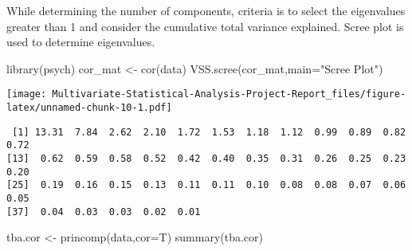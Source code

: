 \documentclass[12pt,twoside]{deuthesis}
\newenvironment{Shaded}{\begin{snugshade}}{\end{snugshade}}
\newcommand{\AttributeTok}[1]{\textcolor[rgb]{0.77,0.63,0.00}{#1}}
\newcommand{\DecValTok}[1]{\textcolor[rgb]{0.00,0.00,0.81}{#1}}
\newcommand{\FunctionTok}[1]{\textcolor[rgb]{0.00,0.00,0.00}{#1}}
\newcommand{\NormalTok}[1]{#1}
\newcommand{\OtherTok}[1]{\textcolor[rgb]{0.56,0.35,0.01}{#1}}
\newcommand{\SpecialCharTok}[1]{\textcolor[rgb]{0.00,0.00,0.00}{#1}}
\newcommand{\StringTok}[1]{\textcolor[rgb]{0.31,0.60,0.02}{#1}}
\begin{document}
While determining the number of components, criteria is to select the eigenvalues greater than 1 and consider the cumulative total variance explained.
Scree plot is used to determine eigenvalues.
\begin{Shaded}
\begin{Highlighting}[]
\FunctionTok{library}\NormalTok{(psych)}
\NormalTok{cor\_mat }\OtherTok{\textless{}{-}} \FunctionTok{cor}\NormalTok{(data)}
\FunctionTok{VSS.scree}\NormalTok{(cor\_mat,}\AttributeTok{main=}\StringTok{"Scree Plot"}\NormalTok{)}
\end{Highlighting}
\end{Shaded}
\texttt{[image: Multivariate-Statistical-Analysis-Project-Report\_files/figure-latex/unnamed-chunk-10-1.pdf]}
\begin{Shaded}
\end{Shaded}
\begin{verbatim}
 [1] 13.31  7.84  2.62  2.10  1.72  1.53  1.18  1.12  0.99  0.89  0.82  0.72
[13]  0.62  0.59  0.58  0.52  0.42  0.40  0.35  0.31  0.26  0.25  0.23  0.20
[25]  0.19  0.16  0.15  0.13  0.11  0.11  0.10  0.08  0.08  0.07  0.06  0.05
[37]  0.04  0.03  0.03  0.02  0.01
\end{verbatim}
\begin{Shaded}
\begin{Highlighting}[]
\NormalTok{tba.cor }\OtherTok{\textless{}{-}} \FunctionTok{princomp}\NormalTok{(data,}\AttributeTok{cor=}\NormalTok{T)}
\FunctionTok{summary}\NormalTok{(tba.cor)}
\end{Highlighting}
\end{Shaded}
\end{document}
